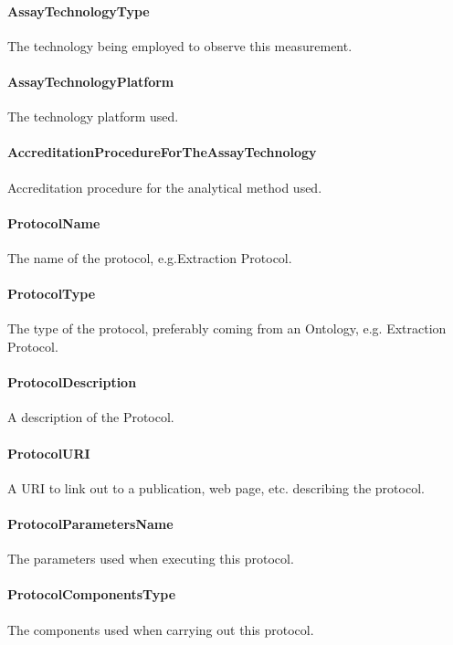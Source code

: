 \documentclass[a4paper]{report}
\begin{document}
\paragraph{AssayTechnologyType}
The technology being employed to observe this measurement.

\paragraph{AssayTechnologyPlatform}
The technology platform used.

\paragraph{AccreditationProcedureForTheAssayTechnology}
Accreditation procedure for the analytical method used.

\paragraph{ProtocolName}
The name of the protocol, e.g.Extraction Protocol.

\paragraph{ProtocolType}
The type of the protocol, preferably coming from an Ontology, e.g. Extraction Protocol.

\paragraph{ProtocolDescription}
A description of the Protocol.

\paragraph{ProtocolURI}
A URI to link out to a publication, web page, etc. describing the protocol.

\paragraph{ProtocolParametersName}
The parameters used when executing this protocol.

\paragraph{ProtocolComponentsType}
The components used when carrying out this protocol.
\end{document}

